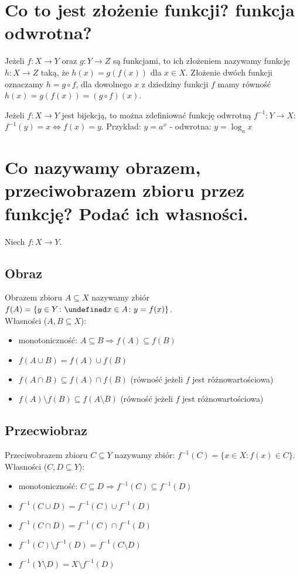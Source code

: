 \documentclass{article}
\numberwithin{equation}{section}
\theoremstyle{definition}
\theoremstyle{case}
\let\implies\Rightarrow
\let\iff\Leftrightarrow
\let\oldexists\exists
\let\exists\undefined
\DeclareMathOperator{\exists}{\mkern2mu\oldexists}
\begin{document}
\section{Co to jest złożenie funkcji? funkcja odwrotna?}
Jeżeli $f \colon X \to Y$ oraz $g \colon Y \to Z$ są funkcjami, to ich złożeniem nazywamy funkcję $h \colon X \to Z$ taką, że ${h(x) = g(f(x))}$ dla $x \in X$. Złożenie dwóch funkcji oznaczamy $h=g \circ f$, dla dowolnego $x$ z dziedziny funkcji $f$ mamy równość $h(x)=g(f(x))=(g \circ f)(x)$.

Jeżeli $f \colon X \to Y$ jest bijekcją, to można zdefiniować funkcję odwrotną $f^{-1} \colon Y \to X$:
${f^{-1}(y)=x \iff f(x)=y}$.
Przykład: $y=a^x$ - odwrotna: $y = \log_a{x}$

\section{Co nazywamy obrazem, przeciwobrazem zbioru przez funkcję? Podać ich własności.}
Niech $f \colon X \to Y$.

\subsection{Obraz}
Obrazem zbioru $A \subseteq X$ nazywamy zbiór ${f(A) = \{y \in Y \colon \exists x \in A \colon y=f(x)\}}$.
\\Własności ($A, B \subseteq X$):
\begin{itemize}
	\item monotoniczność: $A \subseteq B \implies f(A) \subseteq f(B)$
	\item $f(A \cup B) = f(A) \cup f(B)$
	\item $f(A \cap B) \subseteq f(A) \cap f(B)$ (równość jeżeli $f$ jest różnowartościowa)
	\item $f(A)\setminus f(B) \subseteq f(A \setminus B)$ (równość jeżeli $f$ jest różnowartościowa)
\end{itemize}

\subsection{Przecwiobraz}
Przeciwobrazem zbioru $C \subseteq Y$ nazywamy zbiór: ${f^{-1}(C) = \{ x \in X \colon f(x) \in C \}}$.
\\Własności ($C, D \subseteq Y$):
\begin{itemize}
	\item monotoniczność: $C \subseteq D \implies f^{-1}(C) \subseteq f^{-1}(D)$
	\item $f^{-1}(C \cup D) = f^{-1}(C) \cup f^{-1}(D)$
	\item $f^{-1}(C \cap D) = f^{-1}(C) \cap f^{-1}(D)$
	\item $f^{-1}(C) \setminus f^{-1}(D) = f^{-1}(C \setminus D)$
	\item $f^{-1}(Y \setminus D) = X \setminus f^{-1}(D)$
\end{itemize}
\end{document}
